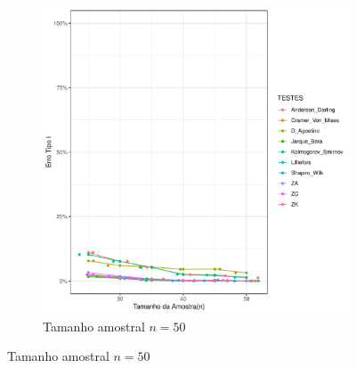 \documentclass[a4paper,11pt]{article} %
\begin{document}
\begin{figure}[H]
\begin{subfigure}[b]{0.45\textwidth}
        \includegraphics[width=\textwidth]{Distribuição Cauchy/Erro Tipo I/erro_tipo_I_cauchy_50.pdf}
        \caption{Tamanho amostral \(n = 50\)}
        \label{fig:cauchy_50}
    \end{subfigure}
    

\end{figure}
\end{document}
